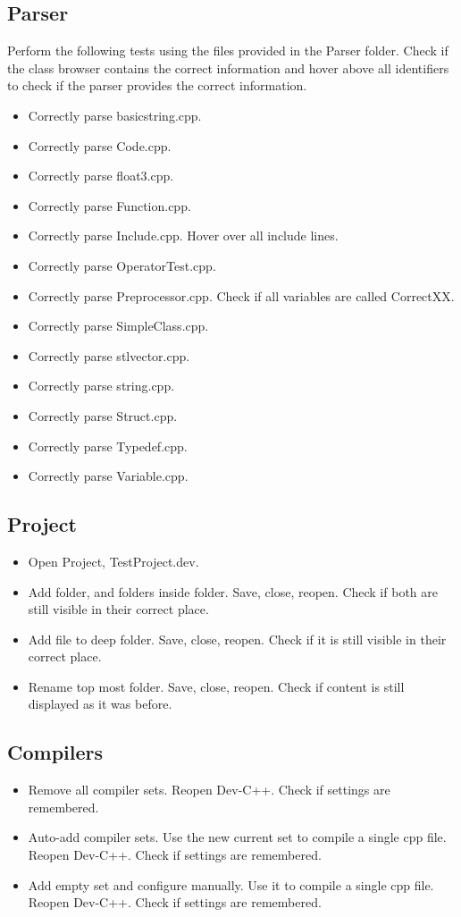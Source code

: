\subsection{Parser}
Perform the following tests using the files provided in the Parser folder. Check if the class browser contains the correct information and hover above all identifiers to check if the parser provides the correct information.
\begin{itemize}
    \item Correctly parse basic\textunderscore string.cpp.
    \item Correctly parse Code.cpp.
    \item Correctly parse float3.cpp.
    \item Correctly parse Function.cpp.
    \item Correctly parse Include.cpp. Hover over all include lines.
    \item Correctly parse OperatorTest.cpp.
    \item Correctly parse Preprocessor.cpp. Check if all variables are called CorrectXX.
    \item Correctly parse SimpleClass.cpp.
    \item Correctly parse stl\textunderscore vector.cpp.
    \item Correctly parse string.cpp.
    \item Correctly parse Struct.cpp.
    \item Correctly parse Typedef.cpp.
    \item Correctly parse Variable.cpp.
\end{itemize}

\subsection{Project}
\begin{itemize}
    \item Open Project, TestProject.dev.
    \item Add folder, and folders inside folder. Save, close, reopen. Check if both are still visible in their correct place.
    \item Add file to deep folder.  Save, close, reopen. Check if it is still visible in their correct place.
    \item Rename top most folder. Save, close, reopen. Check if content is still displayed as it was before.
\end{itemize}

\subsection{Compilers}
\begin{itemize}
    \item Remove all compiler sets. Reopen Dev-C++. Check if settings are remembered.
    \item Auto-add compiler sets. Use the new current set to compile a single cpp file. Reopen Dev-C++. Check if settings are remembered.
    \item Add empty set and configure manually. Use it to compile a single cpp file. Reopen Dev-C++. Check if settings are remembered.
\end{itemize}

